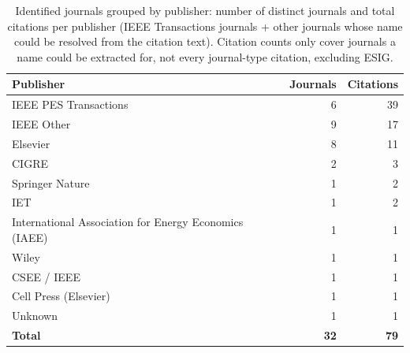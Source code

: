 \begin{table}[htbp]
\centering
\small
\begin{tabular}{lrr}
\toprule
Publisher & Journals & Citations \\
\midrule
    IEEE PES Transactions & 6 & 39 \\
    IEEE Other & 9 & 17 \\
    Elsevier & 8 & 11 \\
    CIGRE & 2 & 3 \\
    Springer Nature & 1 & 2 \\
    IET & 1 & 2 \\
    International Association for Energy Economics (IAEE) & 1 & 1 \\
    Wiley & 1 & 1 \\
    CSEE / IEEE & 1 & 1 \\
    Cell Press (Elsevier) & 1 & 1 \\
    Unknown & 1 & 1 \\
\midrule
    \textbf{Total} & \textbf{32} & \textbf{79} \\
\bottomrule
\end{tabular}
\caption{Identified journals grouped by publisher: number of distinct journals and total citations per publisher (IEEE Transactions journals + other journals whose name could be resolved from the citation text). Citation counts only cover journals a name could be extracted for, not every journal-type citation, excluding ESIG.}
\label{tab:publisher_groups_no_esig}
\end{table}
